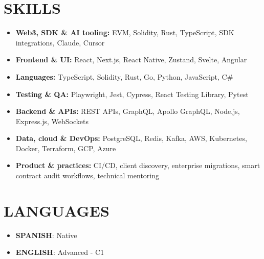 \documentclass{article}
\begin{document}
\section*{SKILLS}
\begin{itemize}
	\item \textbf{Web3, SDK \& AI tooling:} EVM, Solidity, Rust, TypeScript, SDK integrations, Claude, Cursor
	\item \textbf{Frontend \& UI:} React, Next.js, React Native, Zustand, Svelte, Angular
	\item \textbf{Languages:} TypeScript, Solidity, Rust, Go, Python, JavaScript, C\#
	\item \textbf{Testing \& QA:} Playwright, Jest, Cypress, React Testing Library, Pytest
	\item \textbf{Backend \& APIs:} REST APIs, GraphQL, Apollo GraphQL, Node.js, Express.js, WebSockets
	\item \textbf{Data, cloud \& DevOps:} PostgreSQL, Redis, Kafka, AWS, Kubernetes, Docker, Terraform, GCP, Azure
	\item \textbf{Product \& practices:} CI/CD, client discovery, enterprise migrations, smart contract audit workflows, technical mentoring
\end{itemize}

\section*{LANGUAGES}
\begin{itemize}[left=0pt]
	\item \textbf{SPANISH}: Native
	\item \textbf{ENGLISH}: Advanced {-} C1
\end{itemize}
\end{document}
